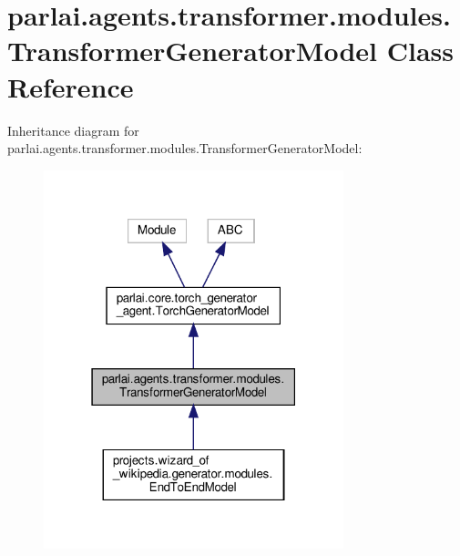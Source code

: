 \hypertarget{classparlai_1_1agents_1_1transformer_1_1modules_1_1TransformerGeneratorModel}{}\section{parlai.\+agents.\+transformer.\+modules.\+Transformer\+Generator\+Model Class Reference}
\label{classparlai_1_1agents_1_1transformer_1_1modules_1_1TransformerGeneratorModel}


Inheritance diagram for parlai.\+agents.\+transformer.\+modules.\+Transformer\+Generator\+Model\+:\nopagebreak
\begin{figure}[H]
\begin{center}
\leavevmode
\includegraphics[width=247pt]{d8/dbb/classparlai_1_1agents_1_1transformer_1_1modules_1_1TransformerGeneratorModel__inherit__graph}
\end{center}
\end{figure}


